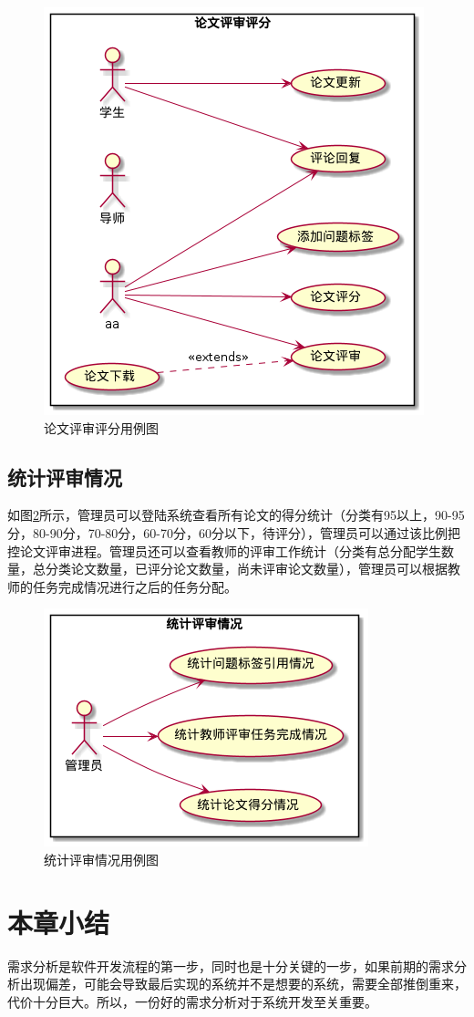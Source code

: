 \begin{figure}[htbp]
	\centering
	\includegraphics[scale = 0.6]{out/uml/用例图/3-论文评审评分/3-论文评审评分.png}
	\caption{\song\wuhao 论文评审评分用例图}
	\label{scoring-usecase}
\end{figure}

\subsection{统计评审情况}

如图\ref{statistic=usecase}所示，管理员可以登陆系统查看所有论文的得分统计（分类有95以上，90-95分，80-90分，70-80分，60-70分，60分以下，待评分），管理员可以通过该比例把控论文评审进程。管理员还可以查看教师的评审工作统计（分类有总分配学生数量，总分类论文数量，已评分论文数量，尚未评审论文数量），管理员可以根据教师的任务完成情况进行之后的任务分配。

\begin{figure}[htbp]
	\centering
	\includegraphics[scale = 0.6]{out/uml/用例图/4-统计评审情况/4-统计评审情况.png}
	\caption{\song\wuhao 统计评审情况用例图}
	\label{statistic=usecase}
\end{figure}

\section{本章小结}

需求分析是软件开发流程的第一步，同时也是十分关键的一步，如果前期的需求分析出现偏差，可能会导致最后实现的系统并不是想要的系统，需要全部推倒重来，代价十分巨大。所以，一份好的需求分析对于系统开发至关重要。